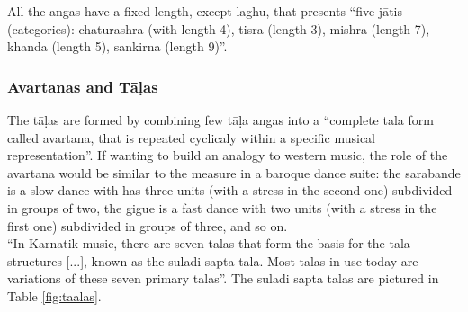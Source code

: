 All the angas have a fixed length, except laghu, that presents ``five j\=atis (categories): chaturashra (with length 4), tisra (length 3), mishra (length 7), khanda (length 5), sankirna (length 9)''\cite[p.64]{krishna}.\\


\subsubsection{Avartanas and T\=a\d{l}as}

The t\=a\d{l}as are formed by combining few t\=a\d{l}a angas into a ``complete tala form called avartana, that is repeated cyclicaly within a specific musical representation''\cite[p.64]{krishna}. If wanting to build an analogy to western music, the role of the avartana would be similar to the measure in a baroque dance suite: the sarabande is a slow dance with has three units (with a stress in the second one) subdivided in groups of two, the gigue is a fast dance with two units (with a stress in the first one) subdivided in groups of three, and so on.\\

``In Karnatik music, there are seven talas that form the basis for the tala structures [...], known as the suladi sapta tala. Most talas in use today are variations of these seven primary talas''\cite[p.64]{krishna}. The suladi sapta talas are pictured in Table \ref{fig:taalas}.


\begin{table}
  \centering
  \caption{The seven primary talas (from \cite[p.65]{krishna}).}
  \label{fig:taalas}
\end{table}



